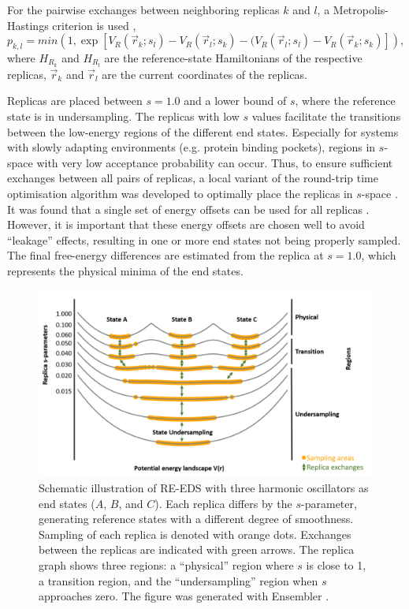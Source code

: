 For the pairwise exchanges between neighboring replicas $k$ and $l$, a Metropolis-Hastings criterion \cite{Hastings1970} is used \cite{Sidler2016,Sugita2000},
\begin{equation}
p_{k,l} = min\left(1, \exp \left[V_{R}(\vec{r}_k; s_l)-V_{R}(\vec{r}_l; s_k)-(V_{R}(\vec{r}_l; s_l)-V_{R}(\vec{r}_k; s_k) \right] \right) ,
\end{equation}
where $H_{R_k}$ and $H_{R_l}$ are the reference-state Hamiltonians of the respective replicas, $\vec{r}_k$ and $\vec{r}_l$ are the current coordinates of the replicas.

Replicas are placed between $s=1.0$ and a lower bound of $s$, where the reference state is in undersampling. The replicas with low $s$ values facilitate the transitions between the low-energy regions of the  different end states. Especially for systems with slowly adapting environments (e.g. protein binding pockets), regions in $s$-space with very low acceptance probability can occur. Thus, to ensure sufficient exchanges between all pairs of replicas, a local variant of the round-trip time optimisation algorithm \cite{Katzgraber2006, Nadler2008} was developed to optimally place the replicas in $s$-space \cite{Sidler2017}.
It was found that a single set of energy offsets can be used for all replicas \cite{Sidler2016}. However, it is important that these energy offsets are chosen well to avoid ``leakage'' effects, resulting in one or more end states not being properly sampled.
The final free-energy differences are estimated from the replica at $s=1.0$, which represents the physical minima of the end states.

\begin{figure}[h]
	\centering
	\includegraphics[width=\columnwidth]{fig/theory/Reeds_scheme_first.png}
	\caption{Schematic illustration of RE-EDS with three harmonic oscillators as end states ($A$, $B$, and $C$). Each replica differs by the $s$-parameter, generating reference states with a different degree of smoothness. Sampling of each replica is denoted with orange dots. Exchanges between the replicas are indicated with green arrows. The replica graph shows three regions: a ``physical'' region where $s$ is close to 1, a transition region, and the ``undersampling'' region when $s$ approaches zero. The figure was generated with Ensembler \cite{ries2021a}.}
	\label{fig:RE-EDS_Scheme}
\end{figure}

